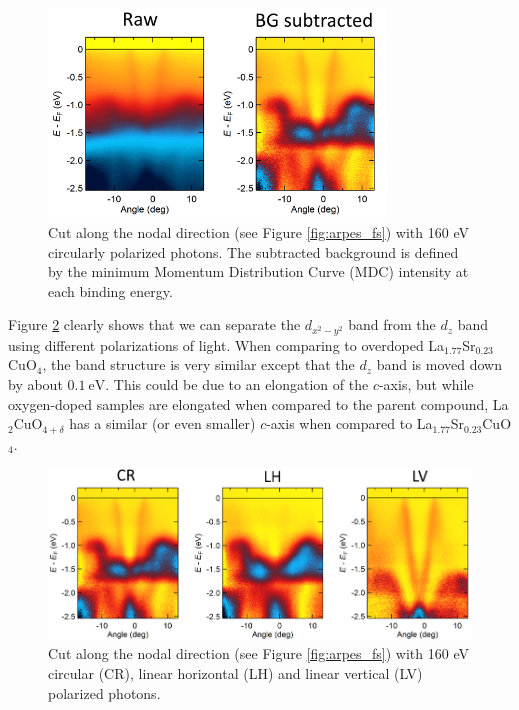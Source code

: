 \begin{figure}
    \centering
    \includegraphics[width=0.8\textwidth]{fig/arpes/hs_cut1.png}
    \caption{Cut along the nodal direction (see Figure \ref{fig:arpes_fs}) with 160 eV circularly polarized photons. The subtracted background is defined by the minimum Momentum Distribution Curve (MDC) intensity at each binding energy.}
    \label{fig:arpes_cut1}
\end{figure}

Figure \ref{fig:arpes_cut2} clearly shows that we can separate the $d_{x^2-y^2}$ band from the $d_z$ band using different polarizations of light. When comparing to overdoped La$_{1.77}$Sr$_{0.23}$CuO$_4$, the band structure is very similar except that the $d_z$ band is moved down by about $\SI{0.1}{\eV}$. This could be due to an elongation of the $c$-axis, but while oxygen-doped samples are elongated when compared to the parent compound, La$_2$CuO$_{4+\delta}$ has a similar (or even smaller) $c$-axis when compared to La$_{1.77}$Sr$_{0.23}$CuO$_4$.

\begin{figure}
    \centering
    \includegraphics[width=\textwidth]{fig/arpes/hs_cut2.png}
    \caption{Cut along the nodal direction (see Figure \ref{fig:arpes_fs}) with 160 eV circular (CR), linear horizontal (LH) and linear vertical (LV) polarized photons.}
    \label{fig:arpes_cut2}
\end{figure}